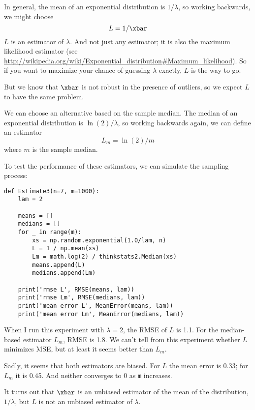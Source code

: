 \documentclass[12pt]{book}
\begin{document}
\newcommand{\lamhat}{L}
\newcommand{\lamhatmed}{L_m}

In general, the mean of an exponential distribution is $1/\lambda$,
so working backwards, we might choose
%
\[ \lamhat = 1 / \xbar\]
%
$\lamhat$ is an
estimator of $\lambda$.  And not just any estimator; it is also the
maximum likelihood estimator (see
\url{http://wikipedia.org/wiki/Exponential_distribution#Maximum_likelihood}).
So if you want to maximize your chance of guessing $\lambda$ exactly,
$\lamhat$ is the way to go.

But we know that $\xbar$ is not robust in the presence of outliers, so
we expect $\lamhat$ to have the same problem.

We can choose an alternative based on the sample median.
The median of an exponential distribution is $\ln(2) / \lambda$,
so working backwards again, we can define an estimator
%
\[ \lamhatmed = \ln(2) / m \]
%
where $m$ is the sample median.

To test the performance of these estimators, we can simulate the
sampling process:

\begin{verbatim}
def Estimate3(n=7, m=1000):
    lam = 2

    means = []
    medians = []
    for _ in range(m):
        xs = np.random.exponential(1.0/lam, n)
        L = 1 / np.mean(xs)
        Lm = math.log(2) / thinkstats2.Median(xs)
        means.append(L)
        medians.append(Lm)

    print('rmse L', RMSE(means, lam))
    print('rmse Lm', RMSE(medians, lam))
    print('mean error L', MeanError(means, lam))
    print('mean error Lm', MeanError(medians, lam))
\end{verbatim}

When I run this experiment with $\lambda=2$, the RMSE of $L$ is
1.1.  For the median-based estimator $L_m$, RMSE is 1.8.  We can't
tell from this experiment whether $L$ minimizes MSE, but at least
it seems better than $L_m$.

Sadly, it seems that both estimators are biased.  For $L$ the mean
error is 0.33; for $L_m$ it is 0.45.  And neither converges to 0
as {\tt m} increases.

It turns out that $\xbar$ is an unbiased estimator of the mean
of the distribution, $1 / \lambda$, but $L$ is not an unbiased
estimator of $\lambda$.
\end{document}
